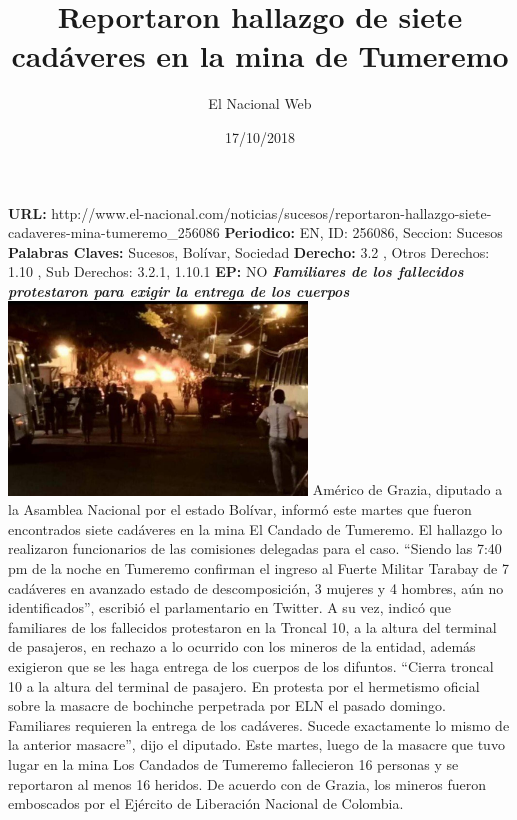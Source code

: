 \documentclass{article}%
\title{\textbf{Reportaron hallazgo de siete cadáveres en la mina de Tumeremo}}%
\author{El Nacional Web}%
\date{17/10/2018}%
\begin{document}
%
\normalsize%
\maketitle%
\textbf{URL: }%
http://www.el{-}nacional.com/noticias/sucesos/reportaron{-}hallazgo{-}siete{-}cadaveres{-}mina{-}tumeremo\_256086\newline%
%
\textbf{Periodico: }%
EN, %
ID: %
256086, %
Seccion: %
Sucesos\newline%
%
\textbf{Palabras Claves: }%
Sucesos, Bolívar, Sociedad\newline%
%
\textbf{Derecho: }%
3.2%
, Otros Derechos: %
1.10%
, Sub Derechos: %
3.2.1, 1.10.1%
\newline%
%
\textbf{EP: }%
NO\newline%
\newline%
%
\textbf{\textit{Familiares de los fallecidos protestaron para exigir la entrega de los cuerpos}}%
\newline%
\newline%
%
\includegraphics[width=300px]{147.jpg}%
\newline%
%
Américo de Grazia, diputado a la Asamblea Nacional por el estado Bolívar, informó este martes que fueron encontrados siete cadáveres en la mina El Candado de Tumeremo. El hallazgo lo realizaron funcionarios de las comisiones delegadas para el caso.%
\newline%
%
“Siendo las 7:40 pm de la noche en Tumeremo confirman el ingreso al Fuerte Militar Tarabay de 7 cadáveres en avanzado estado de descomposición, 3 mujeres y 4 hombres, aún no identificados”, escribió el parlamentario en Twitter.%
\newline%
%
A su vez, indicó que familiares de los fallecidos protestaron en la Troncal 10, a la altura del terminal de pasajeros, en rechazo a lo ocurrido con los mineros de la entidad, además exigieron que se les haga entrega de los cuerpos de los difuntos.%
\newline%
%
“Cierra troncal 10 a la altura del terminal de pasajero. En protesta por el hermetismo oficial sobre la masacre de bochinche perpetrada por ELN el pasado domingo. Familiares requieren la entrega de los cadáveres. Sucede exactamente lo mismo de la anterior masacre”, dijo el diputado.%
\newline%
%
Este martes, luego de la masacre que tuvo lugar en la mina Los Candados de Tumeremo fallecieron 16 personas y se reportaron al menos 16 heridos. De acuerdo con de Grazia, los mineros fueron emboscados por el Ejército de Liberación Nacional de Colombia.%
\newline%
%
\end{document}
